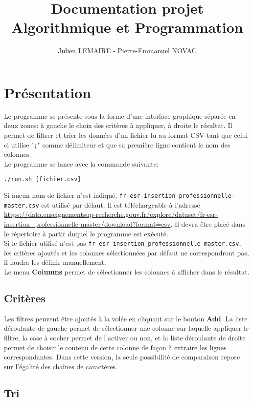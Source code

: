 \documentclass{article}
\title{Documentation projet Algorithmique et Programmation}
\author{Julien LEMAIRE - Pierre-Emmanuel NOVAC}
\begin{document}
\maketitle

\section{Présentation}

Le programme se présente sous la forme d'une interface graphique séparée en deux zones: à gauche le choix des critères à appliquer, à droite le résultat. Il permet de filtrer et trier les données d'un fichier lu au format CSV tant que celui ci utilise "\texttt{;}" comme délimiteur et que sa première ligne contient le nom des colonnes.\\
Le programme se lance avec la commande suivante:
\begin{lstlisting}
./run.sh [fichier.csv]
\end{lstlisting}
Si aucun nom de fichier n'est indiqué, \texttt{fr-esr-insertion\_professionnelle-master.csv} est utilisé par défaut. Il est téléchargeable à l'adresse \url{https://data.enseignementsup-recherche.gouv.fr/explore/dataset/fr-esr-insertion_professionnelle-master/download?format=csv}. Il devra être placé dans le répertoire à partir duquel le programme est exécuté.\\
Si le fichier utilisé n'est pas \texttt{fr-esr-insertion\_professionnelle-master.csv}, les critères ajoutés et les colonnes sélectionnées par défaut ne correspondront pas, il faudra les définir manuellement.\\
Le menu \textbf{Columns} permet de sélectionner les colonnes à afficher dans le résultat.

\subsection{Critères}

Les filtres peuvent être ajoutés à la volée en cliquant sur le bouton \textbf{Add}. La liste déroulante de gauche permet de sélectionner une colonne sur laquelle appliquer le filtre, la case à cocher permet de l'activer ou non, et la liste déroulante de droite permet de choisir le contenu de cette colonne de façon à extraire les lignes correspondantes. Dans cette version, la seule possibilité de comparaison repose sur l'égalité des chaînes de caractères.

\subsection{Tri}
\end{document}
